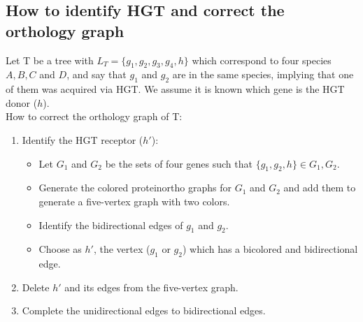 \documentclass[10pt,a4paper,notitlepage]{article}
\begin{document}
\subsection{How to identify HGT and correct the orthology graph}
	Let T be a tree with $L_T=\{ g_1, g_2, g_3, g_4, h\}$ which correspond to four species $A, B, C$ and $D$, and say that $g_1$ and $g_2$ are in the same species, implying that one of them was acquired via HGT. We assume it is known which gene is the HGT donor ($h$). 
	\\
	How to correct the orthology graph of T:
	\begin{enumerate}
		\item Identify the HGT receptor ($h'$):
			\begin{itemize}
				\item Let $G_1$ and $G_2$ be the sets of four genes such that $\{g_1, g_2, h\} \in G_1,G_2$.
				\item Generate the colored proteinortho graphs for $G_1$ and $G_2$ and add them to generate a five-vertex graph with two colors.
				\item Identify the bidirectional edges of $g_1$ and $g_2$.
				\item Choose as $h'$, the vertex ($g_1$ or  $g_2$) which has a bicolored and bidirectional edge.
			\end{itemize}
		\item Delete $h'$ and its edges from the five-vertex graph.
		\item Complete the unidirectional edges to bidirectional edges. 
	\end{enumerate}
	
\end{document}

